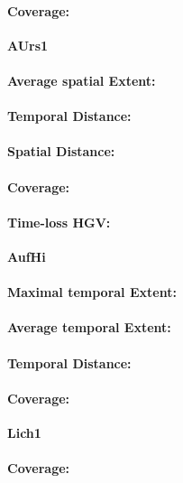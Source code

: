 \begin{table}[ht]
\paragraph{Coverage:}

\large
\centerline{\textbf{AUrs1}}
\normalsize

\paragraph{Average spatial Extent:}
\paragraph{Temporal Distance:}
\paragraph{Spatial Distance:}
\paragraph{Coverage:}
\paragraph{Time-loss HGV:}

\large
\centerline{\textbf{AufHi}}
\normalsize

\paragraph{Maximal temporal Extent:}
\paragraph{Average temporal Extent:}
\paragraph{Temporal Distance:}
\paragraph{Coverage:}

\large
\centerline{\textbf{Lich1}}
\normalsize

\paragraph{Coverage:}


\end{table}
